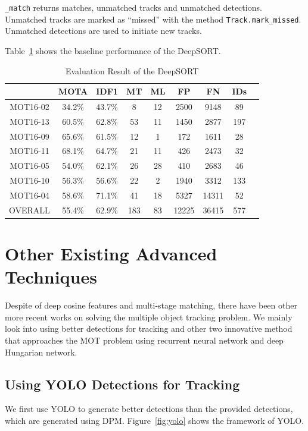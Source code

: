 \documentclass[conference]{IEEEtran}
\begin{document}
\texttt{\_match} returns matches, unmatched tracks and unmatched detections. Unmatched tracks are marked as ``missed'' with the method \texttt{Track.mark\_missed}. Unmatched detections are used to initiate new tracks.

Table~\ref{tab:eval-deepsort} shows the baseline performance of the DeepSORT.

\begin{table}[h]
    \caption{Evaluation Result of the DeepSORT}
    \label{tab:eval-deepsort}
    \begin{tabular}{ccccccccc}
        \hline
        & MOTA & IDF1 & MT & ML & FP & FN & IDs\\\hline
        MOT16-02 & 34.2\% & 43.7\% & 8 & 12 & 2500 & 9148 & 89\\
        MOT16-13 & 60.5\% & 62.8\% & 53 & 11 & 1450 & 2877 & 197\\
        MOT16-09 & 65.6\% & 61.5\% & 12 & 1 & 172 & 1611 & 28\\
        MOT16-11 & 68.1\% & 64.7\% & 21 & 11 & 426 & 2473 & 32\\
        MOT16-05 & 54.0\% & 62.1\% & 26 & 28 & 410 & 2683 & 46\\
        MOT16-10 & 56.3\% & 56.6\% & 22 & 2 & 1940 & 3312 & 133\\
        MOT16-04 & 58.6\% & 71.1\% & 41 & 18 & 5327 & 14311 & 52\\
        OVERALL & 55.4\% & 62.9\% & 183 & 83 & 12225 & 36415 & 577\\\hline
\end{tabular}
\end{table}

\section{Other Existing Advanced Techniques}
Despite of deep cosine features and multi-stage matching, there have been other more recent works on solving the multiple object tracking problem.
We mainly look into using better detections for tracking and other two innovative method that approaches the MOT problem using recurrent neural network and deep Hungarian network.

\subsection{Using YOLO Detections for Tracking}
We first use YOLO\cite{redmon2016you} to generate better detections than the provided detections, which are generated using DPM.
Figure~\ref{fig:yolo} shows the framework of YOLO.
\end{document}
